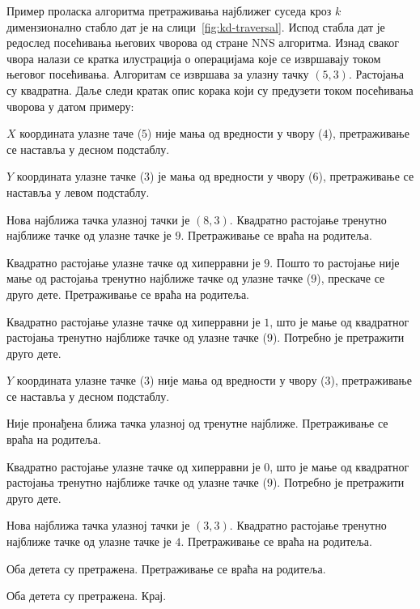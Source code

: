 \documentclass[master]{finthesis}
\newcommand*{\kdim}[1]{\texorpdfstring{$k$\Hyphdash}{k-}димензионал#1}
\begin{document}
Пример проласка алгоритма претраживања најближег суседа кроз \kdim{но} стабло дат је на слици~\ref{fig:kd-traversal}. Испод стабла дат је редослед посећивања његових чворова од стране NNS алгоритма. Изнад сваког чвора налази се кратка илустрација о операцијама које се извршавају током његовог посећивања. Алгоритам се извршава за улазну тачку $(5, 3)$. Растојања су квадратна. Даље следи кратак опис корака који су предузети током посећивања чворова у датом примеру:
\begin{description}
    \newcommand*{\nonleaf}[1]{\item[{%
        \tikz[anchor=south,baseline=4pt] \draw node[align=center,draw,circle] {#1};%
    }]}
    
    \newcommand*{\nl}{\\\hline}
    \newcommand*{\leaf}[1]{\item[{%
        \tikz [anchor=south,baseline=5pt] \draw node {\hspace{-5pt}\begin{tabular}{|>{\centering\arraybackslash}p{3em}|}\hline #1\nl\end{tabular}};%
    }]}
    
    \nonleaf{$4$} $X$ координата улазне таче ($5$) није мања од вредности у чвору ($4$), претраживање се наставља у десном подстаблу.
    \nonleaf{$6$} $Y$ координата улазне тачке ($3$) је мања од вредности у чвору ($6$), претраживање се наставља у левом подстаблу.
    \leaf{$(8, 3)$\nl$(14, 16)$} Нова најближа тачка улазној тачки је $(8, 3)$. Квадратно растојање тренутно најближе тачке од улазне тачке је $9$. Претраживање се враћа на родитеља.
    \nonleaf{$6$} Квадратно растојање улазне тачке од хиперравни је $9$. Пошто то растојање није мање од растојања тренутно најближе тачке од улазне тачке ($9$), прескаче се друго дете. Претраживање се враћа на родитеља.
    \nonleaf{$4$} Квадратно растојање улазне тачке од хиперравни је $1$, што је мање од квадратног растојања тренутно најближе тачке од улазне тачке ($9$). Потребно је претражити друго дете.
    \nonleaf{$3$} $Y$ координата улазне тачке ($3$) није мања од вредности у чвору ($3$), претраживање се наставља у десном подстаблу.
    \leaf{$(2, 12)$\nl$(4, 13)$\nl$(3, 14)$} Није пронађена ближа тачка улазној од тренутне најближе. Претраживање се враћа на родитеља.
    \nonleaf{$3$} Квадратно растојање улазне тачке од хиперравни је $0$, што је мање од квадратног растојања тренутно најближе тачке од улазне тачке ($9$). Потребно је претражити друго дете.
    \leaf{$(2, 2)$\nl$(3,3)$} Нова најближа тачка улазној тачки је $(3, 3)$. Квадратно растојање тренутно најближе тачке од улазне тачке је $4$. Претраживање се враћа на родитеља.
    \nonleaf{$3$} Оба детета су претражена. Претраживање се враћа на родитеља.
    \nonleaf{$4$} Оба детета су претражена. Крај.
\end{description}
\end{document}
